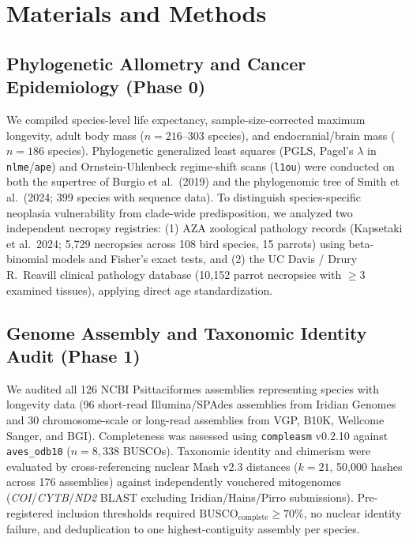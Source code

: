 \documentclass[10pt,a4paper,twocolumn]{article}
\begin{document}
\section{Materials and Methods}

\subsection{Phylogenetic Allometry and Cancer Epidemiology (Phase 0)}
We compiled species-level life expectancy, sample-size-corrected maximum longevity, adult body mass ($n = 216$--$303$ species), and endocranial/brain mass ($n = 186$ species). Phylogenetic generalized least squares (PGLS, Pagel's $\lambda$ in \texttt{nlme}/\texttt{ape}) and Ornstein-Uhlenbeck regime-shift scans (\texttt{l1ou}) were conducted on both the supertree of Burgio et al.\ (2019) and the phylogenomic tree of Smith et al.\ (2024; 399 species with sequence data). To distinguish species-specific neoplasia vulnerability from clade-wide predisposition, we analyzed two independent necropsy registries: (1) AZA zoological pathology records (Kapsetaki et al.\ 2024; 5,729 necropsies across 108 bird species, 15 parrots) using beta-binomial models and Fisher's exact tests, and (2) the UC Davis / Drury R.\ Reavill clinical pathology database (10,152 parrot necropsies with $\ge 3$ examined tissues), applying direct age standardization.

\subsection{Genome Assembly and Taxonomic Identity Audit (Phase 1)}
We audited all 126 NCBI Psittaciformes assemblies representing species with longevity data (96 short-read Illumina/SPAdes assemblies from Iridian Genomes and 30 chromosome-scale or long-read assemblies from VGP, B10K, Wellcome Sanger, and BGI). Completeness was assessed using \texttt{compleasm} v0.2.10 against \texttt{aves\_odb10} ($n = 8,338$ BUSCOs). Taxonomic identity and chimerism were evaluated by cross-referencing nuclear Mash v2.3 distances ($k = 21$, 50,000 hashes across 176 assemblies) against independently vouchered mitogenomes (\textit{COI}/\textit{CYTB}/\textit{ND2} BLAST excluding Iridian/Hains/Pirro submissions). Pre-registered inclusion thresholds required $\text{BUSCO}_{\text{complete}} \ge 70\%$, no nuclear identity failure, and deduplication to one highest-contiguity assembly per species.
\end{document}
